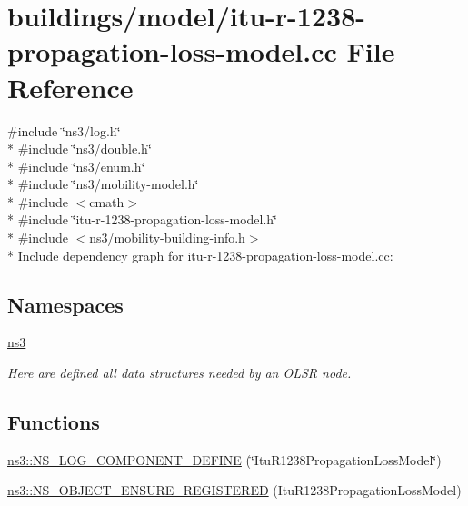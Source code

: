 \hypertarget{itu-r-1238-propagation-loss-model_8cc}{}\section{buildings/model/itu-\/r-\/1238-\/propagation-\/loss-\/model.cc File Reference}
\label{itu-r-1238-propagation-loss-model_8cc}
{\ttfamily \#include \char`\"{}ns3/log.\+h\char`\"{}}\\*
{\ttfamily \#include \char`\"{}ns3/double.\+h\char`\"{}}\\*
{\ttfamily \#include \char`\"{}ns3/enum.\+h\char`\"{}}\\*
{\ttfamily \#include \char`\"{}ns3/mobility-\/model.\+h\char`\"{}}\\*
{\ttfamily \#include $<$cmath$>$}\\*
{\ttfamily \#include \char`\"{}itu-\/r-\/1238-\/propagation-\/loss-\/model.\+h\char`\"{}}\\*
{\ttfamily \#include $<$ns3/mobility-\/building-\/info.\+h$>$}\\*
Include dependency graph for itu-\/r-\/1238-\/propagation-\/loss-\/model.cc\+:
\subsection*{Namespaces}
\begin{DoxyCompactItemize}
\item 
 \hyperlink{namespacens3}{ns3}
\begin{DoxyCompactList}\small\item\em Here are defined all data structures needed by an O\+L\+SR node. \end{DoxyCompactList}\end{DoxyCompactItemize}
\subsection*{Functions}
\begin{DoxyCompactItemize}
\item 
\hyperlink{namespacens3_a7402ace2557729954664ecf2831fd80a}{ns3\+::\+N\+S\+\_\+\+L\+O\+G\+\_\+\+C\+O\+M\+P\+O\+N\+E\+N\+T\+\_\+\+D\+E\+F\+I\+NE} (\char`\"{}Itu\+R1238\+Propagation\+Loss\+Model\char`\"{})
\item 
\hyperlink{namespacens3_ae534055504749f428e1c3c3b41bf72dd}{ns3\+::\+N\+S\+\_\+\+O\+B\+J\+E\+C\+T\+\_\+\+E\+N\+S\+U\+R\+E\+\_\+\+R\+E\+G\+I\+S\+T\+E\+R\+ED} (Itu\+R1238\+Propagation\+Loss\+Model)
\end{DoxyCompactItemize}
